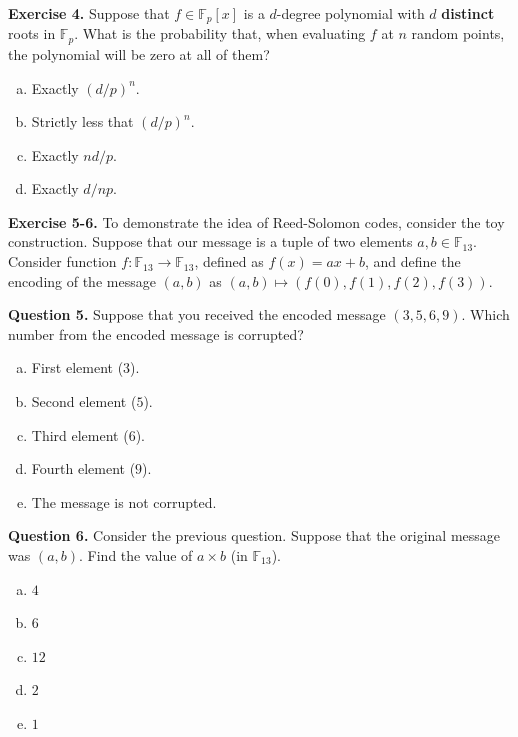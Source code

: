 \documentclass[../lecture-notes.tex]{subfiles}
\begin{document}
\textbf{Exercise 4.} Suppose that $f \in \mathbb{F}_p[x]$ is a $d$-degree polynomial with $d$ \textbf{distinct} roots in $\mathbb{F}_p$. What is the probability that, when evaluating $f$ at $n$ random points, the polynomial will be zero at all of them?

\begin{enumerate}[a)]
    \item Exactly $(d/p)^n$.
    \item Strictly less that $(d/p)^n$.
    \item Exactly $nd/p$.
    \item Exactly $d/np$.
\end{enumerate}

\textbf{Exercise 5-6.} To demonstrate the idea of Reed-Solomon codes, consider the toy construction. Suppose that our message is a tuple of two elements $a,b \in \mathbb{F}_{13}$. Consider function $f: \mathbb{F}_{13} \to \mathbb{F}_{13}$, defined as $f(x) = ax+b$, and define the encoding of the message $(a,b)$ as $(a,b) \mapsto (f(0),f(1),f(2),f(3))$. 

\textbf{Question 5.} Suppose that you received the encoded message $(3,5,6,9)$. Which number from the encoded message is corrupted?
\begin{enumerate}[a)]
    \item First element ($3$).
    \item Second element ($5$).
    \item Third element ($6$).
    \item Fourth element ($9$).
    \item The message is not corrupted.
\end{enumerate}

\textbf{Question 6.} Consider the previous question. Suppose that the original message was $(a,b)$. Find the value of $a \times b$ (in $\mathbb{F}_{13}$).
\begin{enumerate}[a)]
    \item $4$
    \item $6$
    \item $12$
    \item $2$
    \item $1$
\end{enumerate}
\end{document}
